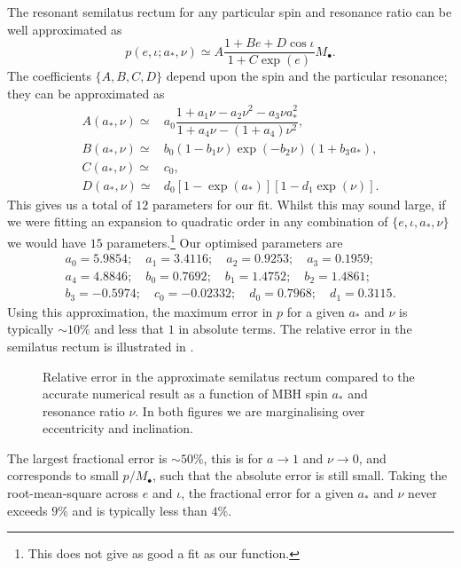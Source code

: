 The resonant semilatus rectum for any particular spin and resonance ratio can be well approximated as
\begin{equation}
p(e,\iota;a_\ast,\nu) \simeq A\dfrac{1 + B e + D \cos\iota}{1 + C\exp(e)} M_\bullet.
\end{equation}
The coefficients $\{A,B,C,D\}$ depend upon the spin and the particular resonance; they can be approximated as
\begin{align} 
A(a_\ast,\nu) \simeq {} & a_0\dfrac{1 + a_1\nu - a_2 \nu^2 - a_3 \nu a_\ast^2}{1 + a_4\nu - (1 + a_4)\nu^2}, \\
B(a_\ast,\nu) \simeq {} & b_0(1 - b_1\nu)\exp(-b_2\nu)(1 + b_3 a_\ast), \\
C(a_\ast,\nu) \simeq {} & c_0, \\
D(a_\ast,\nu) \simeq {} & d_0\left[1 - \exp(a_\ast)\right]\left[1 - d_1\exp(\nu)\right].
\end{align}
This gives us a total of $12$ parameters for our fit. Whilst this may sound large, if we were fitting an expansion to quadratic order in any combination of $\{e,\iota,a_\ast,\nu\}$ we would have $15$ parameters.\footnote{This does not give as good a fit as our function.} Our optimised parameters are
\begin{equation}
\begin{array}{c}
a_0 = 5.9854; \quad a_1 = 3.4116; \quad a_2 = 0.9253; \quad a_3 = 0.1959; \\
a_4 = 4.8846; \quad b_0 = 0.7692; \quad b_1 = 1.4752; \quad b_2 = 1.4861; \\
b_3 = -0.5974; \quad c_0 = -0.02332; \quad d_0 = 0.7968; \quad d_1 = 0.3115.\end{array}
\end{equation} 
Using this approximation, the maximum error in $p$ for a given $a_\ast$ and $\nu$ is typically $\sim10\%$ and less that $1$ in absolute terms. The relative error in the semilatus rectum is illustrated in . 
\begin{figure}%
\centering
  \quad {}
\caption{Relative error in the approximate semilatus rectum compared to the accurate numerical result as a function of MBH spin $a_\ast$ and resonance ratio $\nu$. In both figures we are marginalising over eccentricity and inclination.}\label{fig:p-error}
\end{figure}
The largest fractional error is $\sim50\%$, this is for $a\rightarrow 1$ and $\nu \rightarrow 0$, and corresponds to small $p/M_\bullet$, such that the absolute error is still small. Taking the root-mean-square across $e$ and $\iota$, the fractional error for a given $a_\ast$ and $\nu$ never exceeds $9\%$ and is typically less than $4\%$.

